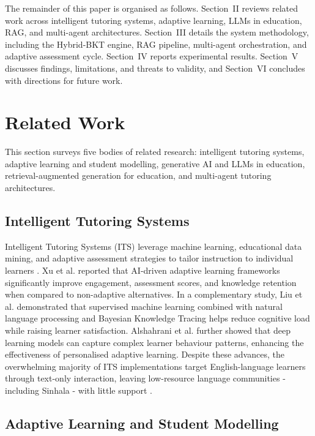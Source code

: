 \documentclass[conference]{IEEEtran}
\begin{document}
The remainder of this paper is organised as follows. Section~II reviews related work across intelligent tutoring systems, adaptive learning, LLMs in education, RAG, and multi-agent architectures. Section~III details the system methodology, including the Hybrid-BKT engine, RAG pipeline, multi-agent orchestration, and adaptive assessment cycle. Section~IV reports experimental results. Section~V discusses findings, limitations, and threats to validity, and Section~VI concludes with directions for future work.

\section{Related Work}

This section surveys five bodies of related research: intelligent tutoring systems, adaptive learning and student modelling, generative AI and LLMs in education, retrieval-augmented generation for education, and multi-agent tutoring architectures.

\subsection{Intelligent Tutoring Systems}

Intelligent Tutoring Systems (ITS) leverage machine learning, educational data mining, and adaptive assessment strategies to tailor instruction to individual learners \cite{b9}. Xu et al. \cite{b10} reported that AI-driven adaptive learning frameworks significantly improve engagement, assessment scores, and knowledge retention when compared to non-adaptive alternatives. In a complementary study, Liu et al. \cite{b11} demonstrated that supervised machine learning combined with natural language processing and Bayesian Knowledge Tracing helps reduce cognitive load while raising learner satisfaction. Alshahrani et al. \cite{b12} further showed that deep learning models can capture complex learner behaviour patterns, enhancing the effectiveness of personalised adaptive learning. Despite these advances, the overwhelming majority of ITS implementations target English-language learners through text-only interaction, leaving low-resource language communities - including Sinhala - with little support \cite{b13}.

\subsection{Adaptive Learning and Student Modelling}
\end{document}
